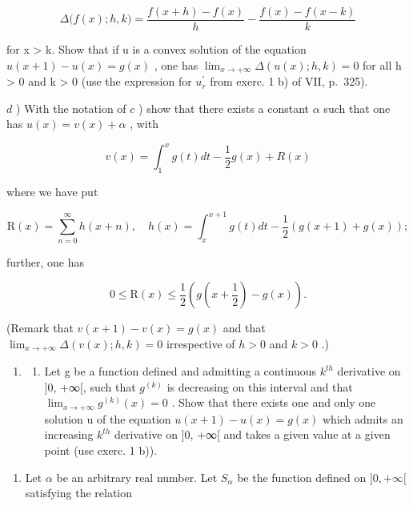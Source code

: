 \[
\varDelta \Big (f (x); h, k \Big) = \frac {f (x + h) - f (x)}{h} - \frac {f (x) - f (x - k)}{k}
\]

for x \textgreater{} k. Show that if u is a convex solution of the equation \(u(x + 1) - u(x) = g(x)\) , one has \(\lim_{x \to +\infty} \Delta(u(x); h, k) = 0\) for all h \textgreater{} 0 and k \textgreater{} 0 (use the expression for \(u_{r}^{\prime}\) from exerc. 1 b) of VII, p.~325).

\(d\) ) With the notation of \(c\) ) show that there exists a constant \(\alpha\) such that one has \(u(x) = v(x) + \alpha\) , with

\[
v (x) = \int_ {1} ^ {x} g (t) d t - \frac {1}{2} g (x) + R (x)
\]

where we have put

\[
\mathrm{R} (x) = \sum_ {n = 0} ^ {\infty} h (x + n), \quad h (x) = \int_ {x} ^ {x + 1} g (t) d t - \frac {1}{2} (g (x + 1) + g (x));
\]

further, one has

\[
0 \leqslant \mathrm{R} (x) \leqslant \frac {1}{2} (g (x + \frac {1}{2}) - g (x)).
\]

(Remark that \(v(x + 1) - v(x) = g(x)\) and that \(\lim_{x\to +\infty}\Delta (v(x);h,k) = 0\) irrespective of \(h > 0\) and \(k > 0\) .)

\begin{enumerate}
\def\labelenumi{\arabic{enumi})}
\setcounter{enumi}{2}
\tightlist
\item
  \begin{enumerate}
  \def\labelenumii{\alph{enumii})}
  \tightlist
  \item
    Let g be a function defined and admitting a continuous \(k^{th}\) derivative on {]}0, +∞{[}, such that \(g^{(k)}\) is decreasing on this interval and that \(\lim_{x\to+\infty}g^{(k)}(x)=0\) . Show that there exists one and only one solution u of the equation \(u(x+1)-u(x)=g(x)\) which admits an increasing \(k^{th}\) derivative on {]}0, +∞{[} and takes a given value at a given point (use exerc. 1 b)).
  \end{enumerate}
\end{enumerate}

\begin{enumerate}
\def\labelenumi{\alph{enumi})}
\setcounter{enumi}{1}
\tightlist
\item
  Let \(\alpha\) be an arbitrary real number. Let \(S_{\alpha}\) be the function defined on \(]0, +\infty[\) satisfying the relation
\end{enumerate}

